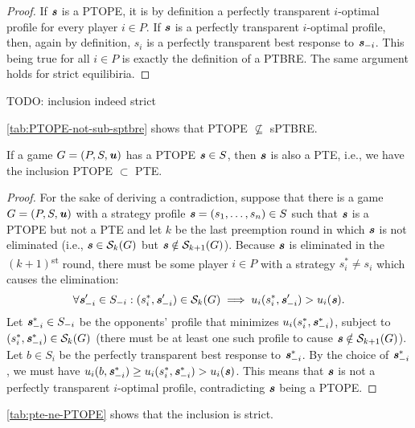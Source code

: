 \begin{proof}
	If $\boldsymbol{\mathit{s}}$ is a PTOPE, it is by definition a perfectly transparent $i$-optimal profile for every player $i \in P$.
	If $\boldsymbol{\mathit{s}}$ is a perfectly transparent $i$-optimal profile, then, again by definition, $s_i$ is a perfectly transparent best response to $\boldsymbol{\mathit{s}}_{-i}$.
	This being true for all $i \in P$ is exactly the definition of a PTBRE.
	The same argument holds for strict equilibiria.
\end{proof}

\begin{remark}
	TODO: inclusion indeed strict
\end{remark}

\begin{remark}
	\autoref{tab:PTOPE-not-sub-sptbre} shows that PTOPE $\not\subseteq$ sPTBRE.
\end{remark}

\begin{lemma}
	\label{th:ptope-subset-pte}
	If a game $G = (P, S, \boldsymbol{\mathit{u}})$ has a PTOPE $\boldsymbol{\mathit{s}} \in S$, then $\boldsymbol{\mathit{s}}$ is also a PTE, i.e., we have the inclusion PTOPE $\subset$ PTE.
\end{lemma}

\begin{proof}
	For the sake of deriving a contradiction, suppose that there is a game $G = (P, S, \boldsymbol{\mathit{u}})$ with a strategy profile $\boldsymbol{\mathit{s}} = (s_1, \dots, s_n) \in S$ such that $\boldsymbol{\mathit{s}}$ is a PTOPE but not a PTE and let $k$ be the last preemption round in which $\boldsymbol{\mathit{s}}$ is not eliminated (i.e., $\boldsymbol{\mathit{s}} \in \mathcal{S}_k(G)$ but $\boldsymbol{\mathit{s}} \notin \mathcal{S}_{k+1}(G)$).
	Because $\boldsymbol{\mathit{s}}$ is eliminated in the $(k+1)$\textsuperscript{st} round, there must be some player $i \in P$ with a strategy $s_i^* \ne s_i$ which causes the elimination:
	\[
		\forall \boldsymbol{\mathit{s}}_{-i}' \in S_{-i}: (s_i^*, \boldsymbol{\mathit{s}}_{-i}') \in \mathcal{S}_k(G) \implies u_i(s_i^*, \boldsymbol{\mathit{s}}_{-i}') > u_i(\boldsymbol{\mathit{s}}).
	\]
	Let $\boldsymbol{\mathit{s}}_{-i}^* \in S_{-i}$ be the opponents' profile that minimizes $u_i(s_i^*, \boldsymbol{\mathit{s}}_{-i}^*)$, subject to $(s_i^*, \boldsymbol{\mathit{s}}_{-i}^*)\in \mathcal{S}_k(G)$ (there must be at least one such profile to cause $\boldsymbol{\mathit{s}} \notin \mathcal{S}_{k+1}(G)$).
	Let $b \in S_i$ be the perfectly transparent best response to $\boldsymbol{\mathit{s}}_{-i}^*$.
	By the choice of $\boldsymbol{\mathit{s}}_{-i}^*$, we must have $u_i(b, \boldsymbol{\mathit{s}}_{-i}^*) \ge u_i(s_i^*, \boldsymbol{\mathit{s}}_{-i}^*) > u_i(\boldsymbol{\mathit{s}})$.
	This means that $\boldsymbol{\mathit{s}}$ is not a perfectly transparent $i$-optimal profile, contradicting $\boldsymbol{\mathit{s}}$ being a PTOPE.
\end{proof}

\begin{remark}
	\autoref{tab:pte-ne-PTOPE} shows that the inclusion is strict.
\end{remark}

